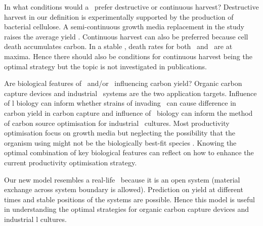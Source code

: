 \documentclass[../thesis.tex]{subfiles} %
\begin{document}
In what conditions would a \pbs\ prefer destructive or continuous harvest?  Destructive harvest in our definition is experimentally supported by the production of bacterial cellulose.  A semi-continuous growth media replacement in the study raises the average yield \autocite{aytekin2016statistical}.  Continuous harvest can also be preferred because cell death accumulates carbon.  In a stable \pbs, death rates for both \phy\ and \bac\ are at maxima.  Hence there should also be conditions for continuous harvest being the optimal strategy but the topic is not investigated in publications.

Are biological features of \phy\ and/or \bac\ influencing carbon yield?  Organic carbon capture devices and industrial \bac\ systems are the two application targets.  Influence of \bac l biology can inform whether strains of invading \bac\ can cause difference in carbon yield in carbon capture and influence of \phy\ biology can inform the method of carbon source optimisation for industrial \bac\ cultures.  Most productivity optimisation focus on growth media \autocite{dash2013marine,naik2013lead,huang2012industrial,evanson_2019} but neglecting the possibility that the organism using might not be the biologically best-fit species \autocite{huang2012industrial}.  Knowing the optimal combination of key biological features can reflect on how to enhance the current productivity optimisation strategy.

Our new model resembles a real-life \pbs\ because it is an open system (material exchange across system boundary is allowed).  Prediction on yield at different times and stable positions of the systems are possible.  Hence this model is useful in understanding the optimal strategies for organic carbon capture devices and industrial \bac l cultures.
\end{document}
